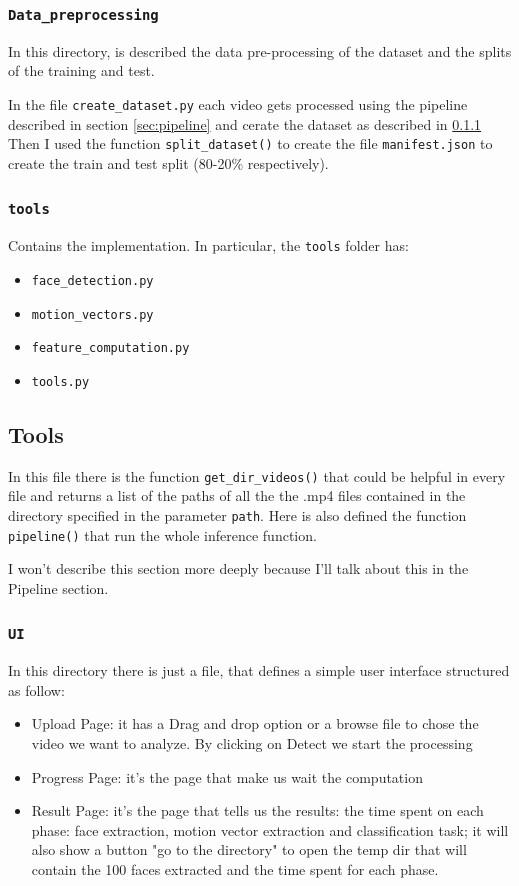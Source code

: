 \documentclass[a4paper,12pt]{article}
\begin{document}
\subsubsection{\texttt{Data\_preprocessing}}
\label{sec:data_preprocessing}
In this directory, is described the data pre-processing of the dataset and the splits of the training and test. 

In the file \texttt{create\_dataset.py} each video gets processed using the pipeline described in section \ref{sec:pipeline} and cerate the dataset as described in \ref{}
Then I used the function \texttt{split\_dataset()} to create the file \texttt{manifest.json} to create the train and test split (80-20\% respectively).

\subsubsection{\texttt{tools}}
\label{sec:tools}
Contains the implementation. In particular, the \texttt{tools} folder has:
\begin{itemize}
  \item \texttt{face\_detection.py}
  \item \texttt{motion\_vectors.py}
  \item \texttt{feature\_computation.py}
  \item \texttt{tools.py}
\end{itemize}

\subsection{Tools}
In this file there is the function \texttt{get\_dir\_videos()} that could be helpful in every file and returns a list of the paths of all the the .mp4 files contained in the directory specified in the parameter \texttt{path}. Here is also defined the function \texttt{pipeline()} that run the whole inference function.

I won't describe this section more deeply because I'll talk about this in the Pipeline section. 

\subsubsection{\texttt{UI}}
In this directory there is just a file, that defines a simple user interface structured as follow:
\begin{itemize}
    \item Upload Page: it has a Drag and drop option or a browse file to chose the video we want to analyze. By clicking on Detect we start the processing
    \item Progress Page: it's the page that make us wait the computation
    \item Result Page: it's the page that tells us the results: the time spent on each phase: face extraction, motion vector extraction and classification task; it will also show a button "go to the directory" to open the temp dir that will contain the 100 faces extracted and the time spent for each phase. 
\end{itemize}
\end{document}
